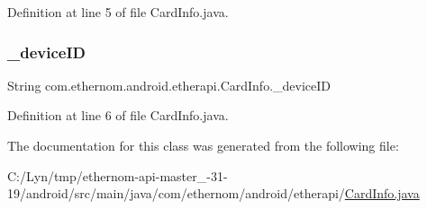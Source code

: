 Definition at line 5 of file Card\+Info.\+java.

\mbox{\label{classcom_1_1ethernom_1_1android_1_1etherapi_1_1_card_info_afa93a69a94c31798c5780c4be71ab86d}} 
\subsubsection{\texorpdfstring{\+\_\+device\+ID}{\_deviceID}}
{\footnotesize\ttfamily String com.\+ethernom.\+android.\+etherapi.\+Card\+Info.\+\_\+device\+ID\hspace{0.3cm}{\ttfamily [package]}}



Definition at line 6 of file Card\+Info.\+java.



The documentation for this class was generated from the following file\+:\begin{DoxyCompactItemize}
\item 
C\+:/\+Lyn/tmp/ethernom-\/api-\/master\+\_-\/31-\/19/android/src/main/java/com/ethernom/android/etherapi/\mbox{\hyperlink{_card_info_8java}{Card\+Info.\+java}}\end{DoxyCompactItemize}
